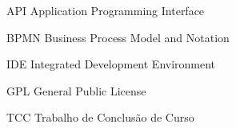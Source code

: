 \begin{siglas}
  \item[API] Application Programming Interface
  \item[BPMN] Business Process Model and Notation 
  \item[IDE] Integrated Development Environment
  \item[GPL] General Public License 
  \item[TCC] Trabalho de Conclusão de Curso
\end{siglas}
